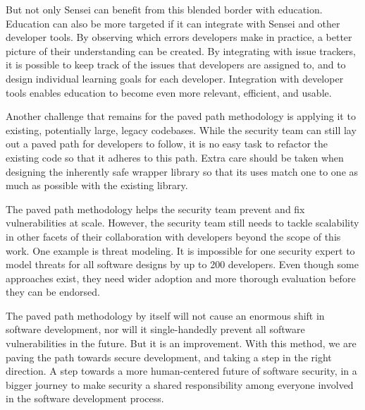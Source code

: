 But not only Sensei can benefit from this blended border with education.
Education can also be more targeted if it can integrate with Sensei and other developer tools. By observing which errors developers make in practice, a better picture of their understanding can be created.
By integrating with issue trackers, it is possible to keep track of the issues that developers are assigned to, and to design individual learning goals for each developer.
Integration with developer tools enables education to become even more relevant, efficient, and usable.

Another challenge that remains for the paved path methodology is applying it to existing, potentially large, legacy codebases. While the security team can still lay out a paved path for developers to follow, it is no easy task to refactor the existing code so that it adheres to this path. 
Extra care should be taken when designing the inherently safe wrapper library so that its uses match one to one as much as possible with the existing library. 

The paved path methodology helps the security team prevent and fix vulnerabilities at scale.
However, the security team still needs to tackle scalability in other facets of their collaboration with developers beyond the scope of this work.
One example is threat modeling.
It is impossible for one security expert to model threats for all software designs by up to 200 developers. 
Even though some approaches exist, they need wider adoption and more thorough evaluation before they can be endorsed.


The paved path methodology by itself will not cause an enormous shift in software development, nor will it single-handedly prevent all software vulnerabilities in the future.
But it is an improvement.
With this method, we are paving the path towards secure development, and taking a step in the right direction.
A step towards a more human-centered future of software security, in a bigger journey to make security a shared responsibility among everyone involved in the software development process.